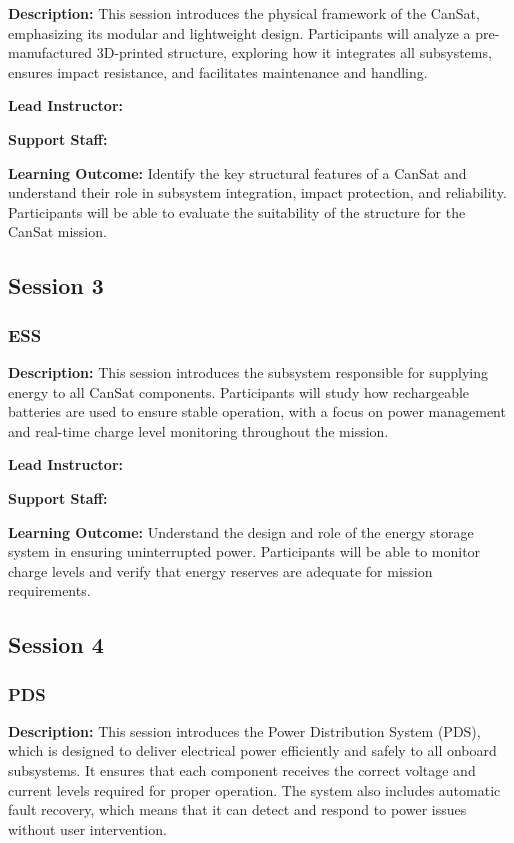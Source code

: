 \documentclass[a4paper,12pt]{article}
\begin{document}
\textbf{Description:} This session introduces the physical framework of the CanSat, emphasizing its modular and lightweight design. Participants will analyze a pre-manufactured 3D-printed structure, exploring how it integrates all subsystems, ensures impact resistance, and facilitates maintenance and handling.

\textbf{Lead Instructor:}

\textbf{Support Staff: }

\textbf{Learning Outcome:} Identify the key structural features of a CanSat and understand their role in subsystem integration, impact protection, and reliability. Participants will be able to evaluate the suitability of the structure for the CanSat mission.

\newpage

\subsection{Session 3}
\subsubsection{ESS}

\textbf{Description:} This session introduces the subsystem responsible for supplying energy to all CanSat components. Participants will study how rechargeable batteries are used to ensure stable operation, with a focus on power management and real-time charge level monitoring throughout the mission.

\textbf{Lead Instructor:}

\textbf{Support Staff: }

\textbf{Learning Outcome:} Understand the design and role of the energy storage system in ensuring uninterrupted power. Participants will be able to monitor charge levels and verify that energy reserves are adequate for mission requirements.

\newpage

\subsection{Session 4}
\subsubsection{PDS}

\textbf{Description:} This session introduces the Power Distribution System (PDS), which is designed to deliver electrical power efficiently and safely to all onboard subsystems. It ensures that each component receives the correct voltage and current levels required for proper operation. The system also includes automatic fault recovery, which means that it can detect and respond to power issues without user intervention. 
\end{document}
